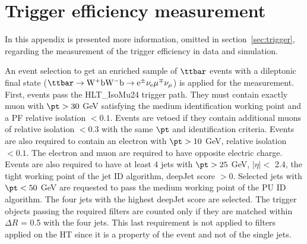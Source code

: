 \chapter{Trigger efficiency measurement} \label{appendix:triggerefficiency}
In this appendix is presented more information, omitted in section~\ref{sec:trigger}, regarding the measurement of the trigger efficiency in data and simulation. 

An event selection to get an enriched sample of $\ttbar$ events with a dileptonic final state ($\mathrm{\ttbar \rightarrow W^{+}b W^{-}b \rightarrow e^{\pm} {\nu}_{e} \mu^{\mp}{\nu}_{\mu}}$) is applied for the measurement. First, events pass the HLT\_IsoMu24 trigger path. They must contain exactly muon with $\pt > 30$ GeV satisfying the medium identification working point and a PF relative isolation $< 0.1$. Events are vetoed if they contain additional muons of relative isolation $< 0.3$ with the same $\pt$ and identification criteria. Events are also required to contain an electron with $\pt > 10$ GeV, relative isolation $< 0.1$. The electron and muon are required to have opposite electric charge.  Events are also required to have at least 4 jets with $\pt > 25$ GeV, $|\eta|<$ 2.4, the tight working point of the jet ID algorithm, deepJet score $>0$. Selected jets with $\pt< 50$ GeV are requested to pass the medium working point of the PU ID algorithm. The four jets with the highest deepJet score are selected. The trigger objects passing the required filters are counted only if they are matched within $\Delta R$ = 0.5 with the four jets. This last requirement is not applied to filters applied on the HT since it is a property of the event and not of the single jets.

